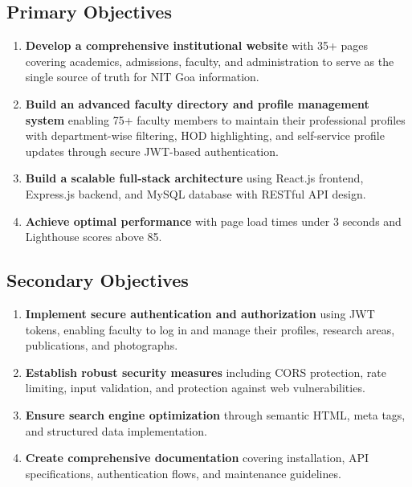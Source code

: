 \documentclass[12pt,a4paper]{report}
\begin{document}
\subsection*{Primary Objectives}

\begin{enumerate}
    \item \textbf{Develop a comprehensive institutional website} with 35+ pages covering academics, admissions, faculty, and administration to serve as the single source of truth for NIT Goa information.
    
    \item \textbf{Build an advanced faculty directory and profile management system} enabling 75+ faculty members to maintain their professional profiles with department-wise filtering, HOD highlighting, and self-service profile updates through secure JWT-based authentication.
    
    \item \textbf{Build a scalable full-stack architecture} using React.js frontend, Express.js backend, and MySQL database with RESTful API design.
    
    \item \textbf{Achieve optimal performance} with page load times under 3 seconds and Lighthouse scores above 85.
\end{enumerate}

\subsection*{Secondary Objectives}

\begin{enumerate}
    \item \textbf{Implement secure authentication and authorization} using JWT tokens, enabling faculty to log in and manage their profiles, research areas, publications, and photographs.
    
    \item \textbf{Establish robust security measures} including CORS protection, rate limiting, input validation, and protection against web vulnerabilities.
    
    \item \textbf{Ensure search engine optimization} through semantic HTML, meta tags, and structured data implementation.
    
    \item \textbf{Create comprehensive documentation} covering installation, API specifications, authentication flows, and maintenance guidelines.
\end{enumerate}
\end{document}
